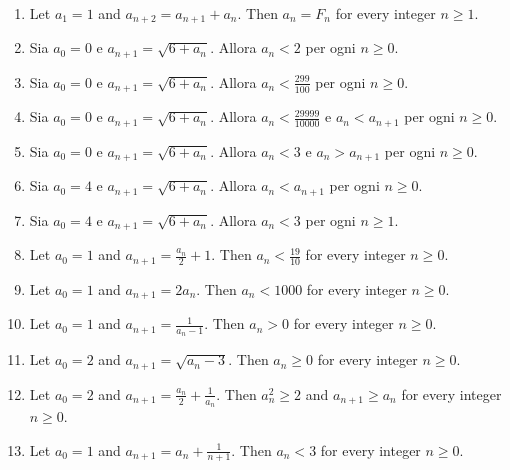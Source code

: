 \documentclass[11pt,a4paper]{article}
\begin{document}
\begin{enumerate}
\item Let $a_1=1$ and $a_{n+2}=a_{n+1}+a_n$. Then $a_n=F_n$ for every integer $n\ge1$.
\item Sia $a_0=0$ e $a_{n+1}=\sqrt{6+a_n}$. Allora $a_n<2$ per ogni $n\ge0$.
\item Sia $a_0=0$ e $a_{n+1}=\sqrt{6+a_n}$. Allora $a_n<\frac{299}{100}$ per ogni $n\ge0$.
\item Sia $a_0=0$ e $a_{n+1}=\sqrt{6+a_n}$. Allora $a_n<\frac{29999}{10000}$ e $a_n<a_{n+1}$ per ogni $n\ge0$.
\item Sia $a_0=0$ e $a_{n+1}=\sqrt{6+a_n}$. Allora $a_n<3$ e $a_n>a_{n+1}$ per ogni $n\ge0$.
\item Sia $a_0=4$ e $a_{n+1}=\sqrt{6+a_n}$. Allora $a_n<a_{n+1}$ per ogni $n\ge0$.
\item Sia $a_0=4$ e $a_{n+1}=\sqrt{6+a_n}$. Allora $a_n<3$ per ogni $n\ge1$.
\item Let $a_0=1$ and $a_{n+1}=\frac{a_n}{2}+1$. Then $a_n<\frac{19}{10}$ for every integer $n\ge0$.
\item Let $a_0=1$ and $a_{n+1}=2a_n$. Then $a_n<1000$ for every integer $n\ge0$.
\item Let $a_0=1$ and $a_{n+1}=\frac{1}{a_n-1}$. Then $a_n>0$ for every integer $n\ge0$.
\item Let $a_0=2$ and $a_{n+1}=\sqrt{a_n-3}$. Then $a_n\ge0$ for every integer $n\ge0$.
\item Let $a_0=2$ and $a_{n+1}=\frac{a_n}{2}+\frac{1}{a_n}$. Then $a_n^2\ge2$ and $a_{n+1}\ge a_n$ for every integer $n\ge0$.
\item Let $a_0=1$ and $a_{n+1}=a_n+\frac{1}{n+1}$. Then $a_n<3$ for every integer $n\ge0$.
\end{enumerate}
\end{document}
